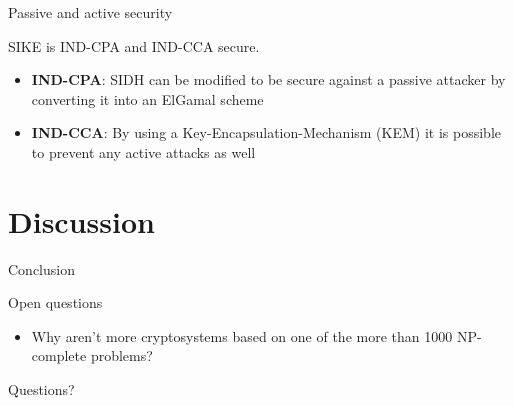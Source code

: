 \documentclass{beamer}
\begin{document}
\begin{frame}{Passive and active security}

SIKE is IND-CPA and IND-CCA secure.

\begin{itemize}[\textbullet]
	\item \textbf{IND-CPA}: SIDH can be modified to be secure against a passive attacker by converting it into an ElGamal scheme
	\item \textbf{IND-CCA}: By using a Key-Encapsulation-Mechanism (KEM) it is possible to prevent any active attacks as well
\end{itemize}

\end{frame}

\section{Discussion}

\begin{frame}{Conclusion}
\end{frame}

\begin{frame}{Open questions}
\begin{itemize}[\textbullet]

	\item Why aren't more cryptosystems based on one of the more than 1000 NP-complete problems? 
\end{itemize}
\end{frame}

\begin{frame}{Questions?}

\end{frame}
\end{document}
